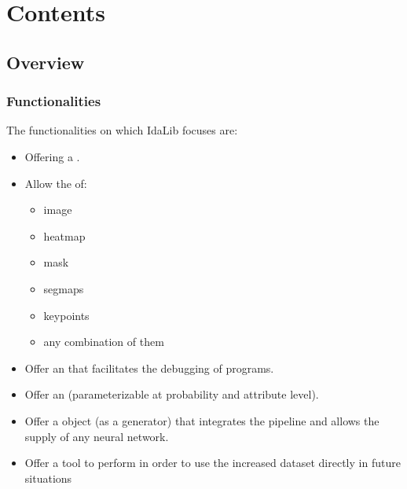 \documentclass[letterpaper,10pt,english]{sphinxmanual}
\begin{document}
\chapter{Contents}
\label{\detokenize{index:contents}}

\section{Overview}
\label{\detokenize{overview:overview}}\label{\detokenize{overview::doc}}

\subsection{Functionalities}
\label{\detokenize{overview:functionalities}}
The functionalities on which IdaLib focuses are:
\begin{itemize}
\item {} 
Offering a .

\item {} 
Allow the   of:
\begin{itemize}
\item {} 
image

\item {} 
heatmap

\item {} 
mask

\item {} 
segmaps

\item {} 
keypoints

\item {} 
any combination of them

\end{itemize}

\item {} 
Offer an  that facilitates the debugging of programs.

\item {} 
Offer an  (parameterizable at probability and attribute level).

\item {} 
Offer a  object (as a generator) that integrates the pipeline and allows the supply of any neural network.

\item {} 
Offer a tool to perform  in order to use the increased dataset directly in future situations

\end{itemize}
\end{document}
